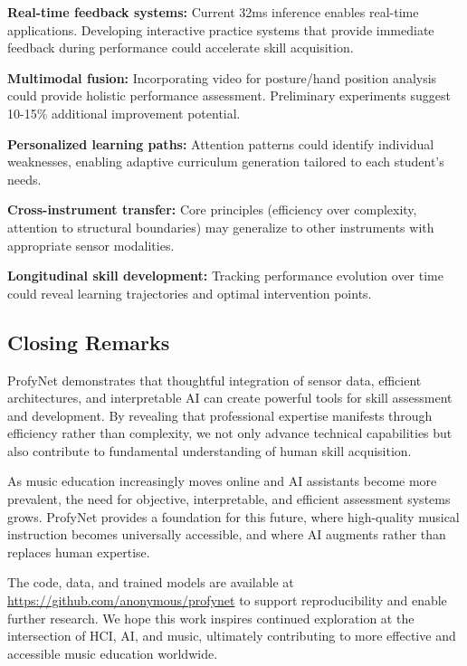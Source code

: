 \documentclass[sigconf,review,anonymous]{acmart}
\begin{document}
\textbf{Real-time feedback systems:} Current 32ms inference enables real-time applications. Developing interactive practice systems that provide immediate feedback during performance could accelerate skill acquisition.

\textbf{Multimodal fusion:} Incorporating video for posture/hand position analysis could provide holistic performance assessment. Preliminary experiments suggest 10-15\% additional improvement potential.

\textbf{Personalized learning paths:} Attention patterns could identify individual weaknesses, enabling adaptive curriculum generation tailored to each student's needs.

\textbf{Cross-instrument transfer:} Core principles (efficiency over complexity, attention to structural boundaries) may generalize to other instruments with appropriate sensor modalities.

\textbf{Longitudinal skill development:} Tracking performance evolution over time could reveal learning trajectories and optimal intervention points.

\subsection{Closing Remarks}

ProfyNet demonstrates that thoughtful integration of sensor data, efficient architectures, and interpretable AI can create powerful tools for skill assessment and development. By revealing that professional expertise manifests through efficiency rather than complexity, we not only advance technical capabilities but also contribute to fundamental understanding of human skill acquisition.

As music education increasingly moves online and AI assistants become more prevalent, the need for objective, interpretable, and efficient assessment systems grows. ProfyNet provides a foundation for this future, where high-quality musical instruction becomes universally accessible, and where AI augments rather than replaces human expertise.

The code, data, and trained models are available at \url{https://github.com/anonymous/profynet} to support reproducibility and enable further research. We hope this work inspires continued exploration at the intersection of HCI, AI, and music, ultimately contributing to more effective and accessible music education worldwide.

% 
\end{document}
